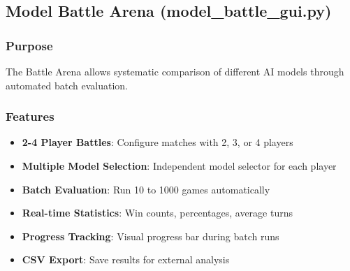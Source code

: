 \documentclass[12pt,a4paper]{article}
\begin{document}
\subsection{Model Battle Arena (model\_battle\_gui.py)}
\subsubsection{Purpose}
The Battle Arena allows systematic comparison of different AI models through automated batch evaluation.
\subsubsection{Features}
\begin{itemize}
    \item \textbf{2-4 Player Battles}: Configure matches with 2, 3, or 4 players
    \item \textbf{Multiple Model Selection}: Independent model selector for each player
    \item \textbf{Batch Evaluation}: Run 10 to 1000 games automatically
    \item \textbf{Real-time Statistics}: Win counts, percentages, average turns
    \item \textbf{Progress Tracking}: Visual progress bar during batch runs
    \item \textbf{CSV Export}: Save results for external analysis
\end{itemize}
\end{document}
